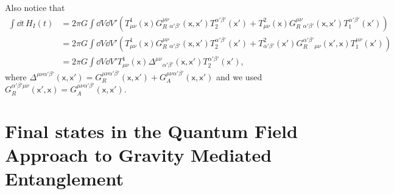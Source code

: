 \documentclass[letterpaper,12pt,titlepage,oneside,final]{book}
\newcommand{\mf}{\mathsf}%
\begin{document}
{Also notice that
\begin{align}
    \int \dd t\, H_I(t) &= 2 \pi G\int \dd V \dd V'\left( T^1_{\mu\nu}(\mf x) G_R^{\mu\nu}{}_{\alpha'\beta'}(\mf x, \mf x')T_2^{\alpha' \beta'}(\mf x') +  T^2_{\mu\nu}(\mf x) G_R^{\mu\nu}{}_{\alpha'\beta'}(\mf x, \mf x')T_1^{\alpha' \beta'}(\mf x')\right) \nonumber\\
    &= 2 \pi G\int \dd V \dd V'\left( T^1_{\mu\nu}(\mf x) G_R^{\mu\nu}{}_{\alpha'\beta'}(\mf x, \mf x')T_2^{\alpha' \beta'}(\mf x') +  T^2_{\alpha'\beta'}(\mf x') G_R^{\alpha'\beta'}{}_{\mu\nu}(\mf x', \mf x)T_1^{\mu \nu}(\mf x')\right) \nonumber\\
    &= 2 \pi G\int \dd V \dd V' T^1_{\mu\nu}(\mf x) \Delta^{\mu\nu}{}_{\alpha'\beta'}(\mf x, \mf x')T_2^{\alpha' \beta'}(\mf x'),
\end{align}
where $\Delta^{\mu\nu\alpha'\beta'}(\mf x, \mf x') = G_R^{\mu\nu\alpha'\beta'}(\mf x, \mf x') + G_A^{\mu\nu\alpha'\beta'}(\mf x,\mf x')$ and we used $G_R^{\alpha'\beta'\mu\nu}(\mf x',\mf x) = G_A^{\mu\nu\alpha'\beta'}(\mf x,\mf x')$.




\chapter{Final states in the Quantum Field Approach to Gravity Mediated Entanglement}\label{app:FinalStates}

}
\end{document}
